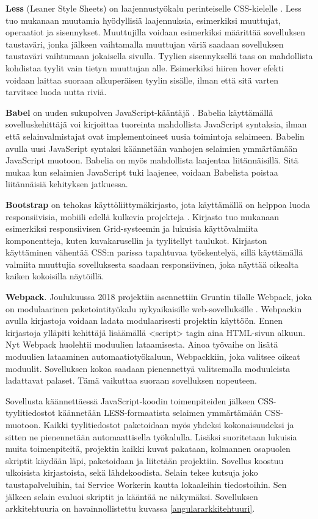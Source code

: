 \documentclass{tktltiki}
\begin{document}
\textbf{Less} (Leaner Style Sheets) on laajennustyökalu perinteiselle CSS-kielelle \cite{7476640}. Less tuo mukanaan muutamia hyödyllisiä laajennuksia, esimerkiksi muuttujat, operaatiot ja sisennykset. Muuttujilla voidaan esimerkiksi määrittää sovelluksen taustaväri, jonka jälkeen vaihtamalla muuttujan väriä saadaan sovelluksen taustaväri vaihtumaan jokaisella sivulla. Tyylien sisennyksellä taas on mahdollista kohdistaa tyylit vain tietyn muuttujan alle. Esimerkiksi hiiren hover efekti voidaan laittaa suoraan alkuperäisen tyylin sisälle, ilman että sitä varten tarvitsee luoda uutta riviä.

\textbf{Babel} on uuden sukupolven JavaScript-kääntäjä \cite{maynard2017getting}. Babelia käyttämällä sovelluskehittäjä voi kirjoittaa tuoreinta mahdollista JavaScript syntaksia, ilman että selainvalmistajat ovat implementoineet uusia toimintoja selaimeen. Babelin avulla uusi JavaScript syntaksi käännetään vanhojen selaimien ymmärtämään JavaScript muotoon. Babelia on myös mahdollista laajentaa liitännäisillä. Sitä mukaa kun selaimien JavaScript tuki laajenee, voidaan Babelista poistaa liitännäisiä kehityksen jatkuessa.

\textbf{Bootstrap} on tehokas käyttöliittymäkirjasto, jota käyttämällä on helppoa luoda responsiivisia, mobiili edellä kulkevia projekteja \cite{balasubramanee2013twitter}. Kirjasto tuo mukanaan esimerkiksi responsiivisen Grid-systeemin ja lukuisia käyttövalmiita komponentteja, kuten kuvakarusellin ja tyylitellyt taulukot. Kirjaston käyttäminen vähentää CSS:n parissa tapahtuvaa työskentelyä, sillä käyttämällä valmiita muuttujia sovelluksesta saadaan responsiivinen, joka näyttää oikealta kaiken kokoisilla näytöillä.

\textbf{Webpack}. Joulukuussa 2018 projektiin asennettiin Gruntin tilalle Webpack, joka on modulaarinen paketointityökalu nykyaikaisille web-sovelluksille \cite{subramanian2017modularization}. Webpackin avulla kirjastoja voidaan ladata modulaarisesti projektin käyttöön. Ennen kirjastoja ylläpiti kehittäjä lisäämällä <script> tagin aina HTML-sivun alkuun. Nyt Webpack huolehtii moduulien lataamisesta. Ainoa työvaihe on lisätä moduulien lataaminen automaatiotyökaluun, Webpackkiin, joka valitsee oikeat moduulit. Sovelluksen kokoa saadaan pienennettyä valitsemalla moduuleista ladattavat palaset. Tämä vaikuttaa suoraan sovelluksen nopeuteen.

Sovellusta käännettäessä JavaScript-koodin toimenpiteiden jälkeen CSS-tyylitiedostot käännetään LESS-formaatista selaimen ymmärtämään CSS-muotoon. Kaikki tyylitiedostot paketoidaan myös yhdeksi kokonaisuudeksi ja sitten ne pienennetään automaattisella työkalulla. Lisäksi suoritetaan lukuisia muita toimenpiteitä, projektin kaikki kuvat pakataan, kolmannen osapuolen skriptit käydään läpi, paketoidaan ja liitetään projektiin. Sovellus koostuu ulkoisista kirjastoista, sekä lähdekoodista. Selain tekee kutsuja joko taustapalveluihin, tai Service Workerin kautta lokaaleihin tiedostoihin. Sen jälkeen selain evaluoi skriptit ja kääntää ne näkymäksi. Sovelluksen arkkitehtuuria on havainnollistettu kuvassa \ref{angulararkkitehtuuri}.
\end{document}
